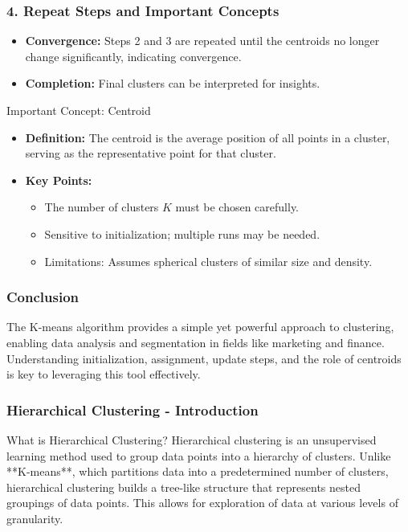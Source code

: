 \documentclass{beamer}
\begin{document}
\begin{frame}[fragile]
    \frametitle{4. Repeat Steps and Important Concepts}
    \begin{itemize}
        \item \textbf{Convergence:} Steps 2 and 3 are repeated until the centroids no longer change significantly, indicating convergence.
        \item \textbf{Completion:} Final clusters can be interpreted for insights.
    \end{itemize}

    \begin{block}{Important Concept: Centroid}
        \begin{itemize}
            \item \textbf{Definition:} The centroid is the average position of all points in a cluster, serving as the representative point for that cluster.
            \item \textbf{Key Points:}
            \begin{itemize}
                \item The number of clusters $K$ must be chosen carefully.
                \item Sensitive to initialization; multiple runs may be needed.
                \item Limitations: Assumes spherical clusters of similar size and density.
            \end{itemize}
        \end{itemize}
    \end{block}
\end{frame}

\begin{frame}[fragile]
    \frametitle{Conclusion}
    The K-means algorithm provides a simple yet powerful approach to clustering, enabling data analysis and segmentation in fields like marketing and finance. Understanding initialization, assignment, update steps, and the role of centroids is key to leveraging this tool effectively.
\end{frame}

\begin{frame}[fragile]
    \frametitle{Hierarchical Clustering - Introduction}
    \begin{block}{What is Hierarchical Clustering?}
        Hierarchical clustering is an unsupervised learning method used to group data points into a hierarchy of clusters. 
        Unlike **K-means**, which partitions data into a predetermined number of clusters, hierarchical clustering builds a tree-like structure that represents nested groupings of data points. 
        This allows for exploration of data at various levels of granularity.
    \end{block}
\end{frame}
\end{document}
